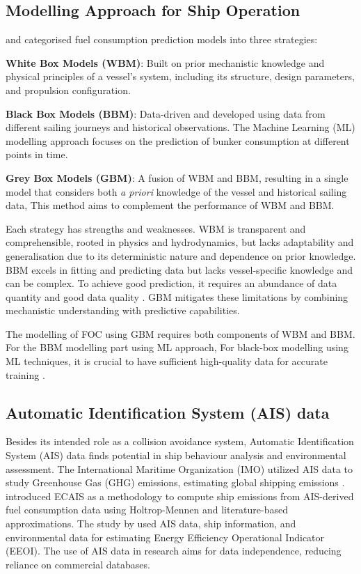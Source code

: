\documentclass[]{interact}
\theoremstyle{plain}%
\theoremstyle{definition}
\theoremstyle{remark}
\begin{document}
\subsection{Modelling Approach for Ship Operation}\label{sec:modelling_type}

\citet{haranen2016white} and \citet{Coraddu.2017} categorised fuel consumption prediction models into three strategies:

\textbf{White Box Models (WBM)}: Built on prior mechanistic knowledge and physical principles of a vessel's system, including its structure, design parameters, and propulsion configuration.

\textbf{Black Box Models (BBM)}: Data-driven and developed using data from different sailing journeys and historical observations. The Machine Learning (ML) modelling approach focuses on the prediction of bunker consumption at different points in time.

\textbf{Grey Box Models (GBM)}: A fusion of WBM and BBM, resulting in a single model that considers both \emph{a priori} knowledge of the vessel and historical sailing data, This method aims to complement the performance of WBM and BBM.

Each strategy has strengths and weaknesses. WBM is transparent and comprehensible, rooted in physics and hydrodynamics, but lacks adaptability and generalisation due to its deterministic nature and dependence on prior knowledge. BBM excels in fitting and predicting data but lacks vessel-specific knowledge and can be complex. To achieve good prediction, it requires an abundance of data quantity and good data quality \citep{Halevy.2009}. GBM mitigates these limitations by combining mechanistic understanding with predictive capabilities.

The modelling of FOC using GBM requires both components of WBM and BBM. For the BBM modelling part using ML approach, For black-box modelling using ML techniques, it is crucial to have sufficient high-quality data for accurate training \citep{Halevy.2009}.

\subsection{Automatic Identification System (AIS) data}\label{sec:ais_theo_j}

Besides its intended role as a collision avoidance system, Automatic Identification System (AIS) data finds potential in ship behaviour analysis and environmental assessment. The International Maritime Organization (IMO) utilized AIS data to study Greenhouse Gas (GHG) emissions, estimating global shipping emissions \citep{IMO.2020,T.W.P.Smith.2015}. \citet{Rakke.2016} introduced ECAIS as a methodology to compute ship emissions from AIS-derived fuel consumption data using Holtrop-Mennen and literature-based approximations. The study by \citet{Kim.2020b} used AIS data, ship information, and environmental data for estimating Energy Efficiency Operational Indicator (EEOI). The use of AIS data in research aims for data independence, reducing reliance on commercial databases.
\end{document}
